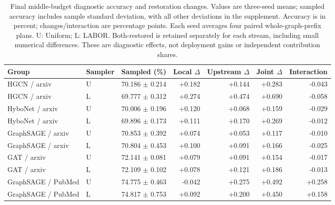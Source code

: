 \begin{table}[t]
\caption{Final middle-budget diagnostic accuracy and restoration changes. Values are three-seed means; sampled accuracy includes sample standard deviation, with all other deviations in the supplement. Accuracy is in percent; changes/interaction are percentage points. Each seed averages four paired whole-graph-prefix plans. U: Uniform; L: LABOR. Both-restored is retained separately for each stream, including small numerical differences. These are diagnostic effects, not deployment gains or independent contribution shares.}
\label{tab:final-mechanism}
\centering
\small
\begin{tabular}{llrrrrr}
\toprule
Group & Sampler & Sampled (\%) & Local $\Delta$ & Upstream $\Delta$ & Joint $\Delta$ & Interaction \\
\midrule
HGCN / arxiv & U & 70.186 $\pm$ 0.214 & +0.182 & +0.144 & +0.283 & -0.043 \\
HGCN / arxiv & L & 69.777 $\pm$ 0.312 & +0.274 & +0.474 & +0.690 & -0.058 \\
HyboNet / arxiv & U & 70.006 $\pm$ 0.196 & +0.120 & +0.068 & +0.159 & -0.029 \\
HyboNet / arxiv & L & 69.896 $\pm$ 0.173 & +0.111 & +0.170 & +0.269 & -0.012 \\
GraphSAGE / arxiv & U & 70.853 $\pm$ 0.392 & +0.074 & +0.053 & +0.117 & -0.010 \\
GraphSAGE / arxiv & L & 70.804 $\pm$ 0.453 & +0.100 & +0.091 & +0.166 & -0.025 \\
GAT / arxiv & U & 72.141 $\pm$ 0.081 & +0.079 & +0.091 & +0.154 & -0.017 \\
GAT / arxiv & L & 72.109 $\pm$ 0.102 & +0.078 & +0.121 & +0.186 & -0.013 \\
GraphSAGE / PubMed & U & 74.775 $\pm$ 0.463 & -0.042 & +0.275 & +0.492 & +0.258 \\
GraphSAGE / PubMed & L & 74.817 $\pm$ 0.753 & +0.092 & +0.200 & +0.450 & +0.158 \\
\bottomrule
\end{tabular}
\end{table}
